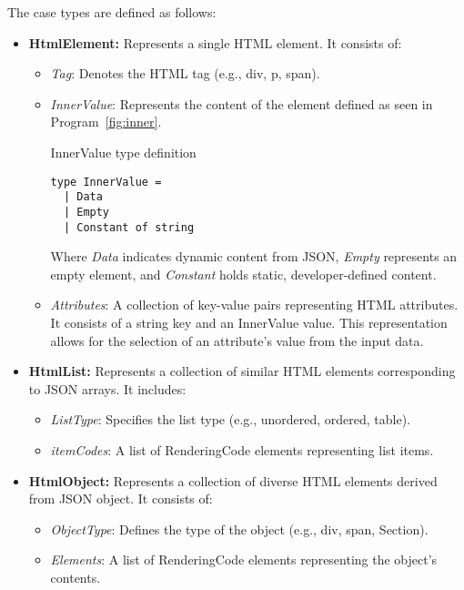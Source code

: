 The case types are defined as follows:
\begin{itemize}
	\item \textbf{HtmlElement:} Represents a single HTML element. It consists of:
	      \begin{itemize}
		      \item \emph{Tag}: Denotes the HTML tag (e.g., div, p, span). \item \emph{InnerValue}: Represents the content of the element defined as seen in Program~\ref{fig:inner}.
		            \begin{listing}
			            \caption{InnerValue type definition}
			            \label{fig:inner}
			            \begin{lstlisting}
type InnerValue =
  | Data 
  | Empty
  | Constant of string  

                  \end{lstlisting}
		            \end{listing}
		            Where \emph{Data} indicates dynamic content from JSON, \emph{Empty} represents an empty element, and \emph{Constant} holds static, developer-defined content.
		      \item {\emph{Attributes}: A collection of key-value pairs representing HTML attributes.
		            It consists of a string key and an InnerValue value. This representation allows for the selection of an attribute's value from the input data.
		            }

	      \end{itemize}

	\item \textbf{HtmlList:} Represents a collection of similar HTML elements corresponding to JSON arrays. It includes:
	      \begin{itemize}
		      \item \emph{ListType}: Specifies the list type (e.g., unordered, ordered, table).
		      \item \emph{itemCodes}: A list of RenderingCode elements representing list items.

	      \end{itemize}

	\item \textbf{HtmlObject:} Represents a collection of diverse HTML elements derived from JSON object. It consists of:
	      \begin{itemize}
		      \item \emph{ObjectType}: Defines the type of the object (e.g., div, span, Section).
		      \item \emph{Elements}: A list of RenderingCode elements representing the object's contents.
	      \end{itemize}


\end{itemize}
